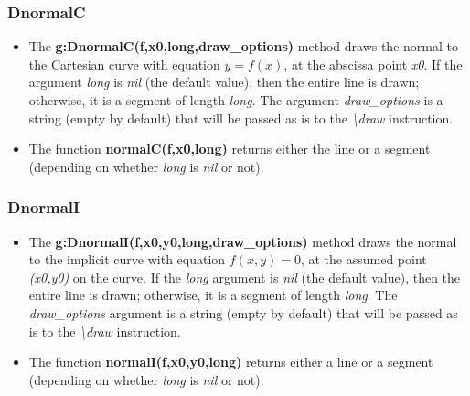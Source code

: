 \subsubsection{ DnormalC}
\begin{itemize}
    \item The \textbf{g:DnormalC(f,x0,long,draw\_options)} method draws the normal to the Cartesian curve with equation \(y=f(x)\), at the abscissa point \emph{x0}. If the argument \emph{long} is \emph{nil} (the default value), then the entire line is drawn; otherwise, it is a segment of length \emph{long}. The argument \emph{draw\_options} is a string (empty by default) that will be passed as is to the \emph{\textbackslash draw} instruction.
    \item The function \textbf{normalC(f,x0,long)} returns either the line or a segment (depending on whether \emph{long} is \emph{nil} or not). \end{itemize}

\subsubsection{DnormalI}
\begin{itemize}
    \item The \textbf{g:DnormalI(f,x0,y0,long,draw\_options)} method draws the normal to the implicit curve with equation \(f(x,y)=0\), at the assumed point \emph{(x0,y0)} on the curve. If the \emph{long} argument is \emph{nil} (the default value), then the entire line is drawn; otherwise, it is a segment of length \emph{long}. The \emph{draw\_options} argument is a string (empty by default) that will be passed as is to the \emph{\textbackslash draw} instruction.
    \item The function \textbf{normalI(f,x0,y0,long)} returns either a line or a segment (depending on whether \emph{long} is \emph{nil} or not).
\end{itemize}

